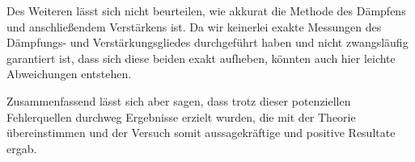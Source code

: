 \documentclass{article}
\newcommand\invisiblesection[1]{%
  \refstepcounter{section}%
  \addcontentsline{toc}{section}{\protect\numberline{\thesection}#1}%
  \sectionmark{#1}\phantom{}}
\begin{document}
Des Weiteren lässt sich nicht beurteilen, wie akkurat die Methode des Dämpfens und anschließendem Verstärkens ist. Da wir keinerlei exakte Messungen des Dämpfungs- und Verstärkungsgliedes durchgeführt haben und nicht zwangsläufig garantiert ist, dass sich diese beiden exakt aufheben, könnten auch hier leichte Abweichungen entstehen. 

Zusammenfassend lässt sich aber sagen, dass trotz dieser potenziellen Fehlerquellen durchweg Ergebnisse erzielt wurden, die mit der Theorie übereinstimmen und der Versuch somit aussagekräftige und positive Resultate ergab.  




 
\newpage


\end{document}

